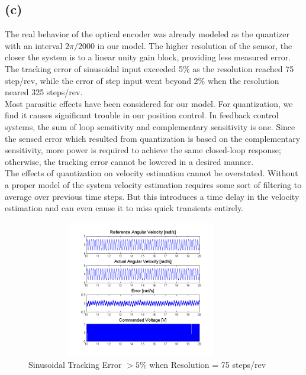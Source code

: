 \documentclass[letterpaper]{article}
\begin{document}
\subsection*{(c)}
The real behavior of the optical encoder was already modeled as the quantizer with an interval $2\pi/2000$ in our model. The higher resolution of the sensor, the closer the system is to a  linear unity gain block, providing less measured error. The tracking error of sinusoidal input exceeded 5\% as the resolution reached 75 step/rev, while the error of step input went beyond 2\% when the resolution neared 325 steps/rev. \\

Most parasitic effects have been considered for our model. For quantization, we find it causes significant trouble in our position control. In feedback control systems, the sum of loop sensitivity  and complementary sensitivity is one. Since the sensed error which resulted from quantization is based on the complementary sensitivity, more power is required to achieve the same closed-loop response; otherwise, the tracking error cannot be lowered in a desired manner. \\

The effects of quantization on velocity estimation cannot be overstated.  Without a proper model of the system velocity estimation requires some sort of filtering to average over previous time steps.  But this introduces a time delay in the velocity estimation and can even cause it to miss quick transients entirely.  

\begin{figure}[H]
\begin{center}
\includegraphics[width = 10cm, height = 6cm]{q5c_sine_75.png}
\caption{Sinusoidal Tracking Error $> 5\%$ when Resolution = 75 steps/rev}
\label{q5_c1}
\end{center}
\end{figure}
\end{document}
